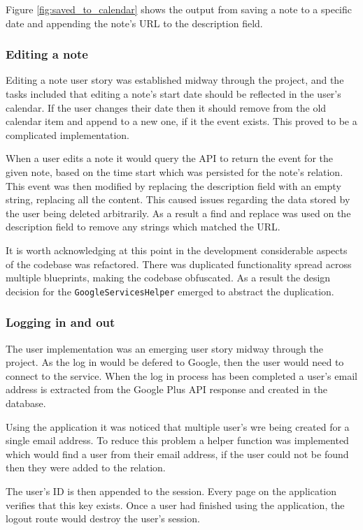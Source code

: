 {{{{{{Figure \ref{fig:saved_to_calendar} shows the output from saving a note to a specific date and appending the note's URL to the description field.

\subsubsection{Editing a note}
Editing a note user story was established midway through the project, and the tasks included that editing a note's start date should be reflected in the user's calendar. If the user changes their date then it should remove from the old calendar item and append to a new one, if it the event exists. This proved to be a complicated implementation.

When a user edits a note it would query the API to return the event for the given note, based on the time start which was persisted for the note's relation. This event was then modified by replacing the description field with an empty string, replacing all the content. This caused issues regarding the data stored by the user being deleted arbitrarily. As a result a find and replace was used on the description field to remove any strings which matched the URL.

It is worth acknowledging at this point in the development considerable aspects of the codebase was refactored. There was duplicated functionality spread across multiple blueprints, making the codebase obfuscated. As a result the design decision for the \texttt{GoogleServicesHelper} emerged to abstract the duplication.

\subsubsection{Logging in and out}
The user implementation was an emerging user story midway through the project. As the log in would be defered to Google, then the user would need to connect to the service. When the log in process has been completed a user's email address is extracted from the Google Plus API response and created in the database.

Using the application it was noticed that multiple user's wre being created for a single email address. To reduce this problem a helper function was implemented which would find a user from their email address, if the user could not be found then they were added to the relation.

The user's ID is then appended to the session. Every page on the application verifies that this key exists. Once a user had finished using the application, the logout route would destroy the user's session.

}}}}}}
